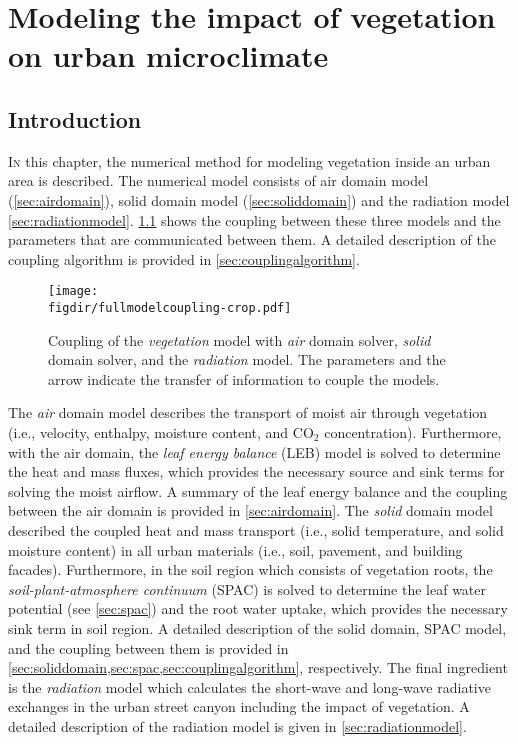 \chapter{Modeling the impact of vegetation on urban microclimate}
\label{ch:numericalmethod}
\def\figdir{chapters/ch05_numericalmodel/figures}	

\section{Introduction}

\lettrine[lines=3,nindent=0em,loversize=0.1]{I}{n} this chapter, the numerical method for modeling vegetation inside an urban area is described. The numerical model consists of air domain model (\cref{sec:airdomain}), solid domain model (\cref{sec:soliddomain}) and the radiation model \cref{sec:radiationmodel}. \cref{fig:fullmodelcoupling} shows the coupling between these three models and the parameters that are communicated between them. A detailed description of the coupling algorithm is provided in \cref{sec:couplingalgorithm}. 

\begin{figure}[h]
	\centering
	\texttt{[image: \\figdir/fullmodelcoupling-crop.pdf]}
	\caption{Coupling of the \textit{vegetation} model with \textit{air} domain solver, \textit{solid} domain solver, and the \textit{radiation} model. The parameters and the arrow indicate the transfer of information to couple the models. }
	\label{fig:fullmodelcoupling}
\end{figure}

The \textit{air} domain model describes the transport of moist air through vegetation (i.e., velocity, enthalpy, moisture content, and CO$_2$ concentration). Furthermore, with the air domain, the \textit{leaf energy balance} (LEB) model is solved to determine the heat and mass fluxes, which provides the necessary source and sink terms for solving the moist airflow. A summary of the leaf energy balance and the coupling between the air domain is provided in \cref{sec:airdomain}. The \textit{solid} domain model described the coupled heat and mass transport (i.e., solid temperature, and solid moisture content) in all urban materials (i.e., soil, pavement, and building facades). Furthermore, in the soil region which consists of vegetation roots, the \textit{soil-plant-atmosphere continuum} (SPAC) is solved to determine the leaf water potential (see \cref{sec:spac}) and the root water uptake, which provides the necessary sink term in soil region. A detailed description of the solid domain, SPAC model, and the coupling between them is provided in \cref{sec:soliddomain,sec:spac,sec:couplingalgorithm}, respectively. The final ingredient is the \textit{radiation} model which calculates the short-wave and long-wave radiative exchanges in the urban street canyon including the impact of vegetation. A detailed description of the radiation model is given in \cref{sec:radiationmodel}.

